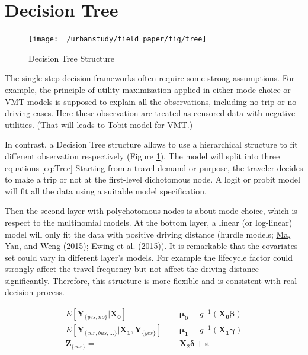 \documentclass[
  11pt,
  openany]{memoir}
\begin{document}
\hypertarget{decision-tree}{%
\section{Decision Tree}\label{decision-tree}}

\begin{figure}

{\centering \texttt{[image: ~/urbanstudy/field\_paper/fig/tree]} 

}

\caption{Decision Tree Structure}\label{fig:Tree}
\end{figure}

The single-step decision frameworks often require some strong assumptions. For example, the principle of utility maximization applied in either mode choice or VMT models is supposed to explain all the observations, including no-trip or no-driving cases.
Here these observation are treated as censored data with negative utilities. (That will leads to Tobit model for VMT.)

In contrast, a Decision Tree structure allows to use a hierarchical structure to fit different observation respectively (Figure \ref{fig:Tree}).
The model will split into three equations \eqref{eq:Tree}
Starting from a travel demand or purpose, the traveler decides to make a trip or not at the first-level dichotomous node.
A logit or probit model will fit all the data using a suitable model specification.

Then the second layer with polychotomous nodes is about mode choice, which is respect to the multinomial models.
At the bottom layer, a linear (or log-linear) model will only fit the data with positive driving distance (hurdle models; \protect\hyperlink{ref-maModelingTrafficCrash2015}{Ma, Yan, and Weng} (\protect\hyperlink{ref-maModelingTrafficCrash2015}{2015}); \protect\hyperlink{ref-ewingVaryingInfluencesBuilt2015}{Ewing et al.} (\protect\hyperlink{ref-ewingVaryingInfluencesBuilt2015}{2015})).
It is remarkable that the covariates set could vary in different layer's models. For example the lifecycle factor could strongly affect the travel frequency but not affect the driving distance significantly.
Therefore, this structure is more flexible and is consistent with real decision process.

\begin{equation}
\begin{split}
E[\mathbf{Y}_{\{yes,no\}}|\mathbf{X_0}]=&\boldsymbol{\mu_0}=g^{-1}(\mathbf{X_0}\boldsymbol{\beta})\\
E[\mathbf{Y}_{\{car,bus,...\}}|\mathbf{X_1},\mathbf{Y}_{\{yes\}}]=&\boldsymbol{\mu_1}=g^{-1}(\mathbf{X_1}\boldsymbol{\gamma})\\
\mathbf{Z}_{\{car\}}=&\mathbf{X}_\mathrm{2}\boldsymbol{\delta} + \boldsymbol{\varepsilon}
\end{split}
\label{eq:Tree}
\end{equation}
\end{document}

